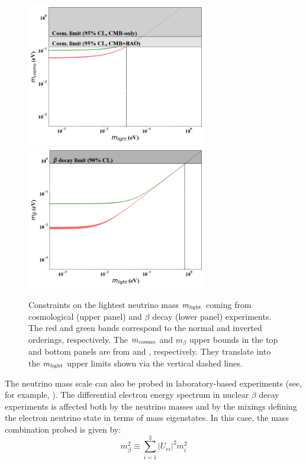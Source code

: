 \begin{figure}[t!b!]
\begin{center}
\includegraphics[width=0.7\textwidth]{img/mcosmovsmlight.png} 
\includegraphics[width=0.7\textwidth]{img/mbetavsmlight.png}
\end{center}
\caption{\label{fig:mass_constraints_cosmo_beta}Constraints on the lightest neutrino mass $m_{\rm light}$ coming from cosmological (upper panel) and $\beta$ decay (lower panel) experiments. The red and green bands correspond to the normal and inverted orderings, respectively. The $m_{{\rm cosmo}}$ and $m_{\beta}$ upper bounds in the top and bottom panels are from \cite{eBOSS:2020yzd} and \cite{KATRIN:2021uub}, respectively. They translate into the $m_{{\rm light}}$ upper limits shown via the vertical dashed lines.}
\end{figure}

The neutrino mass scale can also be probed in laboratory-based experiments (see, for example, \cite{Otten:2008zz}). The differential electron energy spectrum in nuclear $\beta$ decay experiments is affected both by the neutrino masses and by the mixings defining the electron neutrino state in terms of mass eigenstates. In this case, the mass combination probed is given by:
\begin{equation}
m_{\beta}^2 \equiv \sum_{i=1}^3 \lvert U_{ei}\rvert^2 m_i^2
\label{eq:mbeta}
\end{equation}

